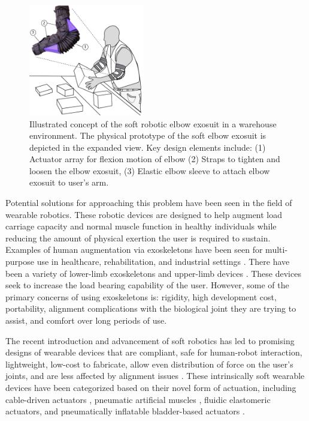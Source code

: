 \documentclass[letterpaper, 10 pt, conference]{ieeeconf}  %
\begin{document}
\begin{figure}[t!]
\centering
\includegraphics[width=0.45\textwidth]{Concept.PNG}
\caption{Illustrated concept of the soft robotic elbow exosuit in a warehouse environment. The physical prototype of the soft elbow exosuit is depicted in the expanded view.  Key design elements include: (1) Actuator array for flexion motion of elbow (2) Straps to tighten and loosen the elbow exosuit, (3) Elastic elbow sleeve to attach elbow exosuit to user’s arm. }
\label{fig:concept}
\vspace{-1.5em}
\end{figure}

Potential solutions for approaching this problem have been seen in the field of wearable robotics. These robotic devices are designed to help augment load carriage capacity and normal muscle function in healthy individuals while reducing the amount of physical exertion the user is required to sustain. Examples of human augmentation via exoskeletons have been seen for multi-purpose use in healthcare, rehabilitation, and industrial settings \cite{Kazerooni2008}. There have been a variety of lower-limb exoskeletons \cite{Viteckova2013} and upper-limb devices \cite{Gopura2016a}. These devices seek to increase the load bearing capability of the user. However, some of the primary concerns of using exoskeletons is:  rigidity, high development cost, portability, alignment complications with the biological joint they are trying to assist, and comfort over long periods of use.

The recent introduction and advancement of soft robotics has led to promising designs of wearable devices that are compliant, safe for human-robot interaction, lightweight, low-cost to fabricate, allow even distribution of force on the user's joints, and are less affected by alignment issues \cite{ADEM:ADEM201700016}. These intrinsically soft wearable devices have been categorized based on their novel form of actuation, including cable-driven actuators \cite{Gopura2016a,Dinh2017,Xiloyannis2017,Ding2016}, pneumatic artificial muscles \cite{Park2014cd,CALDWELL2007a,Al-fahaam2017}, fluidic elastomeric actuators\cite{Polygerinos,Koh2017,Chen2017h}, and pneumatically inflatable bladder-based actuators \cite{Kim2017,Sridar2017,Simpson2017,Koh2017}.
 
\end{document}
